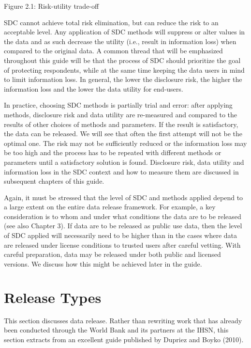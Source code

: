 \documentclass[letterpaper,10pt,english]{sphinxmanual}
\begin{document}
\noindent{}

Figure 2.1: Risk-utility trade-off

SDC cannot achieve total risk elimination, but can reduce the risk to an
acceptable level. Any application of SDC methods will suppress or alter
values in the data and as such decrease the utility (i.e., result in
information loss) when compared to the original data. A common thread
that will be emphasized throughout this guide will be that the process
of SDC should prioritize the goal of protecting respondents, while at
the same time keeping the data users in mind to limit information loss.
In general, the lower the disclosure risk, the higher the information
loss and the lower the data utility for end-users.

In practice, choosing SDC methods is partially trial and error: after
applying methods, disclosure risk and data utility are re-measured and
compared to the results of other choices of methods and parameters. If
the result is satisfactory, the data can be released. We will see that
often the first attempt will not be the optimal one. The risk may not be
sufficiently reduced or the information loss may be too high and the
process has to be repeated with different methods or parameters until a
satisfactory solution is found. Disclosure risk, data utility and
information loss in the SDC context and how to measure them are
discussed in subsequent chapters of this guide.

Again, it must be stressed that the level of SDC and methods applied
depend to a large extent on the entire data release framework. For
example, a key consideration is to whom and under what conditions the
data are to be released (see also Chapter 3). If data are to be released
as public use data, then the level of SDC applied will necessarily need
to be higher than in the cases where data are released under license
conditions to trusted users after careful vetting. With careful
preparation, data may be released under both public and licensed
versions. We discuss how this might be achieved later in the guide.


\chapter{Release Types}
\label{\detokenize{release_types::doc}}\label{\detokenize{release_types:release-types}}
This section discusses data release. Rather than rewriting work that has
already been conducted through the World Bank and its partners at the
IHSN, this section extracts from an excellent guide published by Dupriez
and Boyko (2010).
\end{document}
